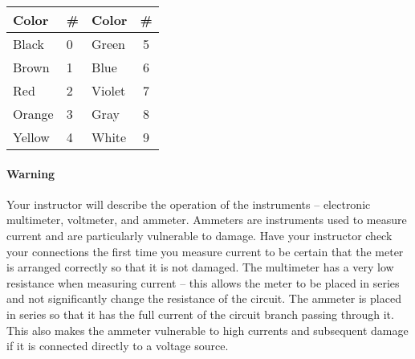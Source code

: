 \begin{multicols}{2}
%

\begin{center}
\begin{tabularx}{\linewidth}{@{}XXXc@{}}
	\hline
	Color	& \# & Color	& \# \\
	\hline
	Black	&	0 &	Green	& 5\\
	Brown	&	1 &	Blue	& 6\\
	Red		&	2 &	Violet	& 7\\
	Orange	&	3 &	Gray	& 8\\
	Yellow	&	4 &	White	& 9\\
\end{tabularx}
\end{center}

\paragraph{Warning}  Your instructor will describe the operation of the instruments -- electronic multimeter, voltmeter, and ammeter.  Ammeters are instruments used to measure current and are particularly vulnerable to damage.  Have your instructor check your connections the first time you measure current to be certain that the meter is arranged correctly so that it is not damaged. The multimeter has a very low resistance when measuring current --  this allows the meter to be placed in series and not significantly change the resistance of the circuit.  The ammeter is placed in series so that it has the full current of the circuit branch passing through it.  This also makes the ammeter vulnerable to high currents and subsequent damage if it is connected directly to a voltage source.


\end{multicols}
